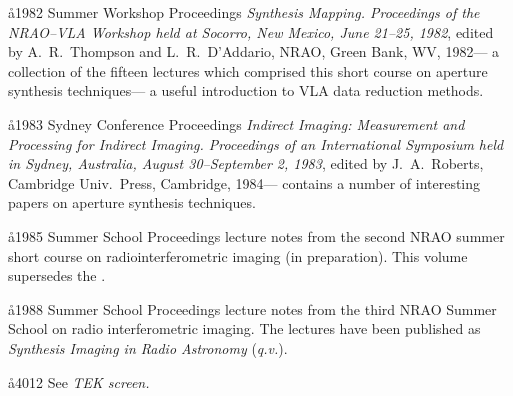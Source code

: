 \aa{1982 Summer Workshop Proceedings}
{\it Synthesis Mapping. Proceedings of the NRAO--VLA Workshop
held at Socorro, New Mexico, June 21--25, 1982}, edited by
A.~R.~Thompson and L.~R.~D'Addario, NRAO, Green Bank, WV, 1982---%
a collection of the fifteen lectures which comprised
this short course on aperture synthesis techniques---%
a useful introduction to VLA data reduction methods.

\aa{1983 Sydney Conference Proceedings}
{\it Indirect Imaging: Measurement and Processing for Indirect Imaging.
Proceedings of an International Symposium held in Sydney, Australia,
August 30--September 2, 1983},
edited by J.~A.~Roberts, Cambridge Univ.\ Press, Cambridge, 1984---%
contains a number of interesting papers on aperture synthesis techniques.

\aa{1985 Summer School Proceedings}
lecture notes from the second NRAO summer short course on
radiointerferometric imaging (in preparation).
This volume supersedes the \wsp.

\aa{1988 Summer School Proceedings}
lecture notes from the third NRAO Summer School on radio interferometric
imaging.  The lectures have been published as {\it Synthesis Imaging in Radio
Astronomy} ({\it q.v.}).

\aa{4012} See {\it TEK screen.}
\vfill\eject
\hphantom{.}
\vfill\eject
\hphantom{.}
